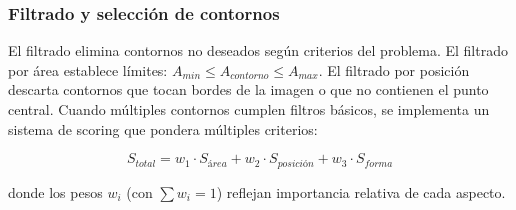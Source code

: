 \subsubsection{Filtrado y selección de contornos}

El filtrado elimina contornos no deseados según criterios del problema. El filtrado por área establece límites: $A_{min} \leq A_{contorno} \leq A_{max}$. El filtrado por posición descarta contornos que tocan bordes de la imagen o que no contienen el punto central. Cuando múltiples contornos cumplen filtros básicos, se implementa un sistema de scoring que pondera múltiples criterios:

\begin{equation}
S_{total} = w_1 \cdot S_{área} + w_2 \cdot S_{posición} + w_3 \cdot S_{forma}
\end{equation}

donde los pesos $w_i$ (con $\sum w_i = 1$) reflejan importancia relativa de cada aspecto.
